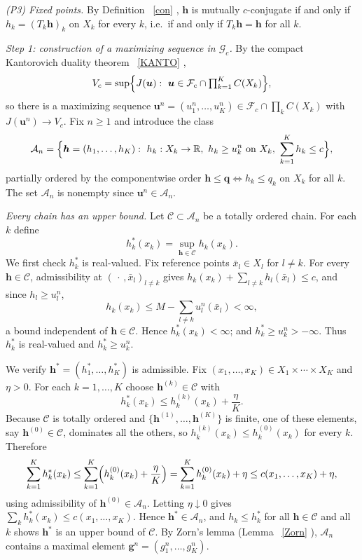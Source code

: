\documentclass[twoside,11pt,a4paper]{article}
\newcommand*{\SavedRef}{}
\let\SavedRef\ref
\renewcommand*{\ref}[1]{  \begingroup
    \hypersetup{
      linkcolor=linkequation,
      linkbordercolor=linkequation,
    }    \SavedRef{#1}  \endgroup
}
\begin{document}
\emph{(P3) Fixed points.} By Definition~\ref{con}, $\boldsymbol h$ is mutually
$c$-conjugate if and only if $h_k=(T_k\boldsymbol h)_k$ on $X_k$ for every $k$,
i.e.\ if and only if $T_k\boldsymbol h=\boldsymbol h$ for all $k$.

\medskip
\noindent\emph{Step 1: construction of a maximizing sequence in $\mathcal G_c$.}
By the compact Kantorovich duality theorem~\ref{KANTO},
\[
V_c=\sup\Bigl\{J(\boldsymbol u):\ \boldsymbol u\in\mathcal F_c\cap\textstyle\prod_{k=1}^K C(X_k)\Bigr\},
\]
so there is a maximizing sequence
$\boldsymbol u^n=(u_1^n,\dots,u_K^n)\in\mathcal F_c\cap\prod_k C(X_k)$ with
$J(\boldsymbol u^n)\to V_c$. Fix $n\ge1$ and introduce the class
\[
\mathcal A_n=\Bigl\{\boldsymbol h=(h_1,\dots,h_K):\ h_k:X_k\to\mathbb R,\
h_k\ge u_k^n\ \text{on }X_k,\ \sum_{k=1}^K h_k\le c\Bigr\},
\]
partially ordered by the componentwise order
$\boldsymbol h\le\boldsymbol q\iff h_k\le q_k$ on $X_k$ for all $k$. The set
$\mathcal A_n$ is nonempty since $\boldsymbol u^n\in\mathcal A_n$.

\emph{Every chain has an upper bound.} Let $\mathcal C\subset\mathcal A_n$ be a
totally ordered chain. For each $k$ define
\[
h_k^*(x_k)=\sup_{\boldsymbol h\in\mathcal C}h_k(x_k).
\]
We first check $h_k^*$ is real-valued. Fix reference points $\bar x_l\in X_l$ for
$l\ne k$. For every $\boldsymbol h\in\mathcal C$, admissibility at
$(\,\cdot\,,\bar x_l)_{l\ne k}$ gives
$h_k(x_k)+\sum_{l\ne k}h_l(\bar x_l)\le c$, and since $h_l\ge u_l^n$,
\[
h_k(x_k)\le M-\sum_{l\ne k}u_l^n(\bar x_l)<\infty,
\]
a bound independent of $\boldsymbol h\in\mathcal C$. Hence
$h_k^*(x_k)<\infty$; and $h_k^*\ge u_k^n>-\infty$. Thus $h_k^*$ is real-valued and
$h_k^*\ge u_k^n$.

We verify $\boldsymbol h^*=(h_1^*,\dots,h_K^*)$ is admissible. Fix
$(x_1,\dots,x_K)\in X_1\times\cdots\times X_K$ and $\eta>0$. For each
$k=1,\dots,K$ choose $\boldsymbol h^{(k)}\in\mathcal C$ with
\[
h_k^*(x_k)\le h_k^{(k)}(x_k)+\frac{\eta}{K}.
\]
Because $\mathcal C$ is totally ordered and $\{\boldsymbol h^{(1)},\dots,\boldsymbol h^{(K)}\}$
is finite, one of these elements, say $\boldsymbol h^{(0)}\in\mathcal C$, dominates
all the others, so $h_k^{(k)}(x_k)\le h_k^{(0)}(x_k)$ for every $k$. Therefore
\[
\sum_{k=1}^K h_k^*(x_k)
\le\sum_{k=1}^K\Bigl(h_k^{(0)}(x_k)+\frac{\eta}{K}\Bigr)
=\sum_{k=1}^K h_k^{(0)}(x_k)+\eta
\le c(x_1,\dots,x_K)+\eta,
\]
using admissibility of $\boldsymbol h^{(0)}\in\mathcal A_n$. Letting
$\eta\downarrow0$ gives $\sum_k h_k^*(x_k)\le c(x_1,\dots,x_K)$. Hence
$\boldsymbol h^*\in\mathcal A_n$, and $h_k\le h_k^*$ for all
$\boldsymbol h\in\mathcal C$ and all $k$ shows $\boldsymbol h^*$ is an upper bound
of $\mathcal C$.
By Zorn's lemma (Lemma~\ref{Zorn}), $\mathcal A_n$ contains a maximal element
$\boldsymbol g^n=(g_1^n,\dots,g_K^n)$.
\end{document}
